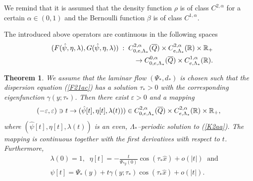 \documentclass[a4paper,reqno,12pt]{amsart}
\theoremstyle{plain}
\newtheorem{theorem}{Theorem}[section]
\theoremstyle{definition}
\numberwithin{equation}{section}
\begin{document}






We remind that it is assumed that the density function $\rho$ is of class $C^{2,\alpha}$
for a certain $\alpha\in (0,1)$ and the Bernoulli function $\beta$ is of class
$C^{1,\alpha}$.

The introduced above operators are continuous in the following spaces
\begin{eqnarray*}
&&(F(\hat{\psi},\eta,\lambda),G(\hat{\psi},\eta,\lambda))\;:\;
C^{2,\alpha}_{0,e,\Lambda_*}(\overline{Q})\times C^{2,\alpha}_{e,\Lambda_*}(\Bbb R)\times\Bbb R_+\\
&&\rightarrow C^{0,\alpha}_{0,e,\Lambda_*}(\overline{Q})\times C^{1,\alpha}_{e,\Lambda_*}(\Bbb R).
\end{eqnarray*}

\begin{theorem}\label{TA17a} We assume that the laminar flow $(\Psi_*,d_*)$ is chosen such that the dispersion  equation (\ref{F21ac}) has a solution $\tau_*>0$ with the corresponding eigenfunction $\gamma(y;\tau_*)$.
Then there exist $\varepsilon > 0$ and a mapping
\begin{equation}\label{Ma2bb}
(-\varepsilon,\varepsilon)\ni t\rightarrow (\hat{\psi}[t],\eta[t],\lambda(t)))\in C^{2,\alpha}_{0,e,\Lambda_*}(\overline{Q})\times C^{2,\alpha}_{e,\Lambda_*}(\Bbb R)\times\Bbb R_+,
\end{equation}
where $(\hat{\psi}[t],\eta[t],\lambda(t))$ is an even, $\Lambda_*$--periodic solution to (\ref{K2aa}). The mapping is continuous together with the first derivatives with respect to $t$. Furthermore,
\begin{eqnarray}\label{A17aczz}
&&\lambda(0)=1,\;\;\eta[t]=-\frac{t}{\Psi_{*y}(0)}\cos(\tau_*\hat{x})+o(|t|)
\;\;\mbox{and}\nonumber\\
&&\psi[t]=\Psi_*(y)+t\gamma(y;\tau_*)\cos(\tau_*\hat{x})+o(|t|).
\end{eqnarray}

\end{theorem}
\end{document}
